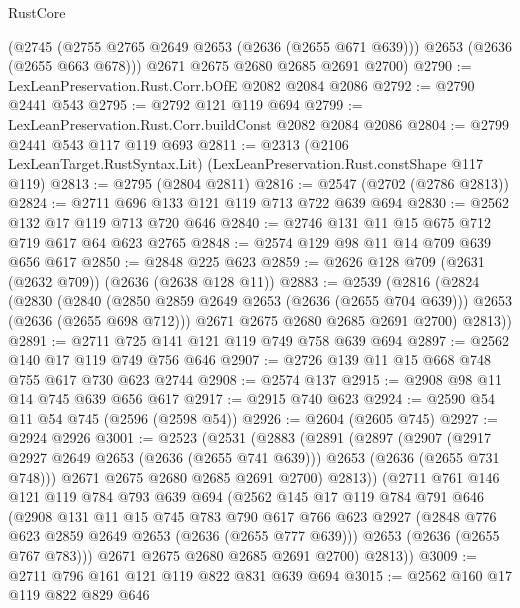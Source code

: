 \begin{lexlean}{RustCore}
\begin{coremodule}
      (@2745 (@2755 @2765 @2649 @2653 (@2636 (@2655 @671 @639))) @2653 (@2636 (@2655 @663 @678)))
      @2671
      @2675
      @2680
      @2685
      @2691
      @2700)
@2790 := LexLeanPreservation.Rust.Corr.bOfE @2082 @2084 @2086
@2792 := @2790 @2441 @543
@2795 := @2792 @121 @119 @694
@2799 := LexLeanPreservation.Rust.Corr.buildConst @2082 @2084 @2086
@2804 := @2799 @2441 @543 @117 @119 @693
@2811 := @2313 (@2106 LexLeanTarget.RustSyntax.Lit) (LexLeanPreservation.Rust.constShape @117 @119)
@2813 := @2795 (@2804 @2811)
@2816 := @2547 (@2702 (@2786 @2813))
@2824 := @2711 @696 @133 @121 @119 @713 @722 @639 @694
@2830 := @2562 @132 @17 @119 @713 @720 @646
@2840 := @2746 @131 @11 @15 @675 @712 @719 @617 @64 @623 @2765
@2848 := @2574 @129 @98 @11 @14 @709 @639 @656 @617
@2850 := @2848 @225 @623
@2859 := @2626 @128 @709 (@2631 (@2632 @709)) (@2636 (@2638 @128 @11))
@2883 := @2539
    (@2816
      (@2824
        (@2830
          (@2840
            (@2850 @2859 @2649 @2653 (@2636 (@2655 @704 @639)))
            @2653
            (@2636 (@2655 @698 @712)))
          @2671
          @2675
          @2680
          @2685
          @2691
          @2700)
        @2813))
@2891 := @2711 @725 @141 @121 @119 @749 @758 @639 @694
@2897 := @2562 @140 @17 @119 @749 @756 @646
@2907 := @2726 @139 @11 @15 @668 @748 @755 @617 @730 @623 @2744
@2908 := @2574 @137
@2915 := @2908 @98 @11 @14 @745 @639 @656 @617
@2917 := @2915 @740 @623
@2924 := @2590 @54 @11 @54 @745 (@2596 (@2598 @54))
@2926 := @2604 (@2605 @745)
@2927 := @2924 @2926
@3001 := @2523
    (@2531
      (@2883
        (@2891
          (@2897
            (@2907
              (@2917 @2927 @2649 @2653 (@2636 (@2655 @741 @639)))
              @2653
              (@2636 (@2655 @731 @748)))
            @2671
            @2675
            @2680
            @2685
            @2691
            @2700)
          @2813))
      (@2711
        @761
        @146
        @121
        @119
        @784
        @793
        @639
        @694
        (@2562
          @145
          @17
          @119
          @784
          @791
          @646
          (@2908
            @131
            @11
            @15
            @745
            @783
            @790
            @617
            @766
            @623
            @2927
            (@2848 @776 @623 @2859 @2649 @2653 (@2636 (@2655 @777 @639)))
            @2653
            (@2636 (@2655 @767 @783)))
          @2671
          @2675
          @2680
          @2685
          @2691
          @2700)
        @2813))
@3009 := @2711 @796 @161 @121 @119 @822 @831 @639 @694
@3015 := @2562 @160 @17 @119 @822 @829 @646

\end{coremodule}
\end{lexlean}
